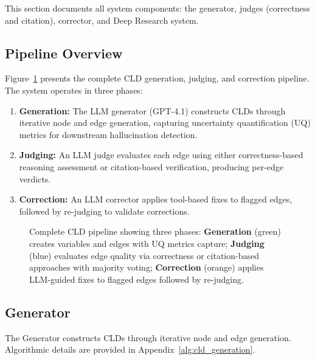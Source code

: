 This section documents all system components: the generator, judges (correctness and citation), corrector, and Deep Research system.

\subsection{Pipeline Overview}
\label{sec:methods_system_overview}

Figure~\ref{fig:cld_pipeline} presents the complete CLD generation, judging, and correction pipeline. The system operates in three phases:

\begin{enumerate}[noitemsep]
    \item \textbf{Generation:} The LLM generator (GPT-4.1) constructs CLDs through iterative node and edge generation, capturing uncertainty quantification (UQ) metrics for downstream hallucination detection.
    \item \textbf{Judging:} An LLM judge evaluates each edge using either correctness-based reasoning assessment or citation-based verification, producing per-edge verdicts.
    \item \textbf{Correction:} An LLM corrector applies tool-based fixes to flagged edges, followed by re-judging to validate corrections.
\end{enumerate}

\begin{figure}[H]
\centering
\resizebox{\textwidth}{!}{%

}
\caption{Complete CLD pipeline showing three phases: \textbf{Generation} (green) creates variables and edges with UQ metrics capture; \textbf{Judging} (blue) evaluates edge quality via correctness or citation-based approaches with majority voting; \textbf{Correction} (orange) applies LLM-guided fixes to flagged edges followed by re-judging.}
\label{fig:cld_pipeline}
\end{figure}

\subsection{Generator}
\label{sec:generator}

The Generator constructs CLDs through iterative node and edge generation. Algorithmic details are provided in Appendix~\ref{alg:cld_generation}.

